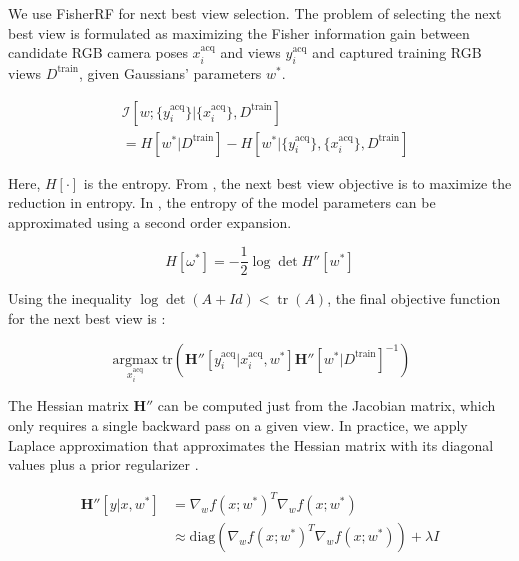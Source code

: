 \documentclass[letterpaper, 10 pt, conference]{ieeeconf}  %
\begin{document}
 We use FisherRF \cite{jiang2023fisherrf} for next best view selection.  The problem of selecting the next best view is formulated as maximizing the Fisher information gain between candidate RGB camera poses $x_{i}^{\text{acq}}$ and views $y_{i}^{\text{acq}}$ and captured training RGB views $D^{\text{train}}$, given Gaussians' parameters $w^*$.


\begin{equation}
    \begin{aligned}
        &\mathcal{I}[w;\{ y_i^{\text{acq}}\}|\{ x_i^{\text{acq}}\}, D^{\text{train}}] \\
        & = H[w^*| D^{\text{train}}] - H[w^*|\{ y_i^{\text{acq}}\}, \{ x_i^{\text{acq}}\}, D^{\text{train}}]
    \end{aligned}
\end{equation}


Here, $H[\cdot]$ is the entropy. From \cite{BayesianActiveLearning}, the next best view objective is to maximize the reduction in entropy. In \cite{UnifyApproach}, the entropy of the model parameters can be approximated using a second order expansion.

\begin{equation}
    H[\omega^*] = -\frac{1}{2} \log \mathop{det} H''[w^*]
\end{equation}

Using the inequality $\log \det (A + Id) < \mathop{tr} (A)$, the final objective function for the next best view is \cite{UnifyApproach}:

\begin{equation}
    \mathop{\text{argmax}} \limits_{x_{i}^{\text{acq}}} \text{tr}(\mathbf{H}''[y_i^{\text{acq}} | x_i^{\text{acq}}, w^*]\mathbf{H}''[w^* | D^{\text{train}} ]^{-1})
\end{equation}

The Hessian matrix $\mathbf{H}''$ can be computed just from the Jacobian matrix, which only requires a single backward pass on a given view. In practice, we apply Laplace approximation that approximates the Hessian matrix with its diagonal values plus a prior regularizer \cite{jiang2023fisherrf,LaplaceRedux}.

\begin{equation}
\begin{aligned}
     \mathbf{H}''[y|x, w^*] &= \nabla_w f(x;w^*)^T \nabla_w f(x;w^*) \\
                   &\approx \text{diag}(\nabla_w f(x;w^*)^T \nabla_w f(x;w^*)) + \lambda I
\end{aligned}
\end{equation}
\end{document}
